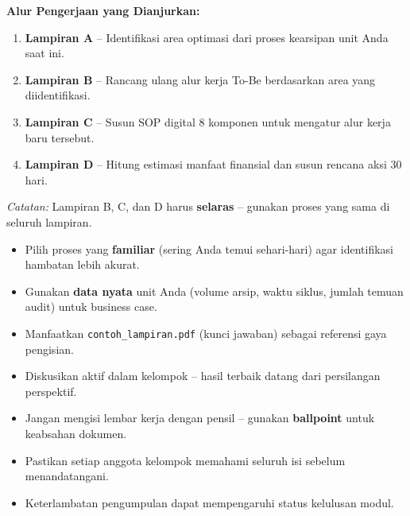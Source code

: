 \documentclass[12pt,a4paper]{report}
\begin{document}
\vspace{0.4cm}

\begin{instruksibox}
\textbf{Alur Pengerjaan yang Dianjurkan:}
\begin{enumerate}
    \item \textbf{Lampiran A} -- Identifikasi area optimasi dari proses kearsipan unit Anda saat ini.
    \item \textbf{Lampiran B} -- Rancang ulang alur kerja To-Be berdasarkan area yang diidentifikasi.
    \item \textbf{Lampiran C} -- Susun SOP digital 8 komponen untuk mengatur alur kerja baru tersebut.
    \item \textbf{Lampiran D} -- Hitung estimasi manfaat finansial dan susun rencana aksi 30 hari.
\end{enumerate}
\textit{Catatan:} Lampiran B, C, dan D harus \textbf{selaras} -- gunakan proses yang sama di seluruh lampiran.
\end{instruksibox}

\vspace{0.3cm}

\begin{tipbox}
\begin{itemize}
    \item Pilih proses yang \textbf{ familiar} (sering Anda temui sehari-hari) agar identifikasi hambatan lebih akurat.
    \item Gunakan \textbf{data nyata} unit Anda (volume arsip, waktu siklus, jumlah temuan audit) untuk business case.
    \item Manfaatkan \texttt{contoh\_lampiran.pdf} (kunci jawaban) sebagai referensi gaya pengisian.
    \item Diskusikan aktif dalam kelompok -- hasil terbaik datang dari persilangan perspektif.
\end{itemize}
\end{tipbox}

\vspace{0.3cm}

\begin{warnbox}
\begin{itemize}
    \item Jangan mengisi lembar kerja dengan pensil -- gunakan \textbf{ballpoint} untuk keabsahan dokumen.
    \item Pastikan setiap anggota kelompok memahami seluruh isi sebelum menandatangani.
    \item Keterlambatan pengumpulan dapat mempengaruhi status kelulusan modul.
\end{itemize}
\end{warnbox}
\end{document}
